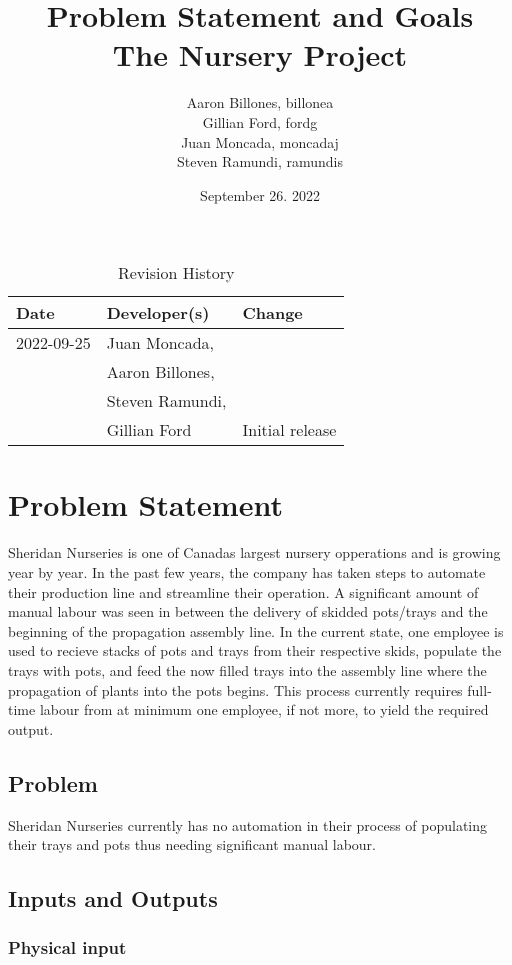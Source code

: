 \documentclass{article}
\title{Problem Statement and Goals\\The Nursery Project}
\author{Aaron Billones, billonea\\Gillian Ford, fordg\\Juan Moncada, moncadaj\\Steven Ramundi, ramundis}
\date{September 26. 2022}
\begin{document}
\maketitle

\begin{table}[hp]
\caption{Revision History} \label{TblRevisionHistory}
\begin{tabularx}{\textwidth}{llX}
\toprule
\textbf{Date} & \textbf{Developer(s)} & \textbf{Change}\\
\midrule
2022-09-25 & Juan Moncada,\\&Aaron Billones,\\&Steven Ramundi,\\&Gillian Ford & Initial release\\
 
\bottomrule
\end{tabularx}
\end{table}

\newpage

\section{Problem Statement}

Sheridan Nurseries is one of Canadas largest nursery opperations and is growing year by year.
In the past few years, the company has taken steps to automate their production line and streamline their operation.
A significant amount of manual labour was seen in between the delivery of skidded pots/trays and the beginning of the propagation 
assembly line. In the current state, one employee is used to recieve stacks of pots and trays from their respective skids,
populate the trays with pots, and feed the now filled trays into the assembly line where the propagation of plants into the pots begins.
This process currently requires full-time labour from at minimum one employee, if not more, to yield the required output.

\subsection{Problem}
Sheridan Nurseries currently has no automation in their process of populating their trays and pots thus needing significant manual labour.

\subsection{Inputs and Outputs}
\subsubsection{Physical input}
\end{document}
